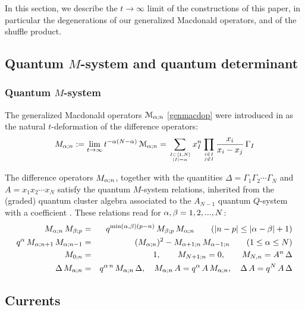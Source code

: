 
In this section, we describe the $t\to \infty$ limit of the constructions of this paper, in particular the 
degenerations of our generalized Macdonald operators, and of the shuffle product.

\subsection{Quantum $M$-system and quantum determinant}

\subsubsection{Quantum $M$-system}
The generalized Macdonald operators ${\mathcal M}_{{\alpha};n}$ \eqref{genmacdop} were introduced in \cite{DFK15} 
as the natural $t$-deformation of the difference operators:
\begin{equation}\label{oldmac}
M_{{\alpha};n}:=\lim_{t\to \infty} t^{-{\alpha}(N-{\alpha})}\, {\mathcal M}_{{\alpha};n}=\sum_{I\subset [1,N]\atop |I|={\alpha}} x_I^n \prod_{i\in I\atop j\not\in I}
\frac{x_i}{x_i-x_j} \, \Gamma_I
\end{equation}

The difference operators $M_{{\alpha};n}$, together with the quantities $\Delta=\Gamma_1\Gamma_2\cdots \Gamma_N$
and $A=x_1x_2\cdots x_N$ satisfy the quantum $M$-system relations, inherited from the (graded) quantum cluster algebra
associated to the $A_{N-1}$ quantum $Q$-system with a coefficient \cite{DFK15}.
These relations read for ${\alpha},\beta =1,2,...,N$:
\begin{eqnarray*}
M_{{\alpha};n}\, M_{\beta;p}&=& q^{\min({\alpha},\beta)(p-n)}\, M_{\beta;p}\, M_{{\alpha};n}\qquad (|n-p|\leq |{\alpha}-\beta|+1)\\
q^{\alpha} \, M_{{\alpha};n+1} \, M_{{\alpha};n-1}&=& (M_{{\alpha};n})^2-M_{{\alpha}+1;n}\, M_{{\alpha}-1;n} \qquad (1\leq {\alpha} \leq N)\\
M_{0;n}&=&1 , \qquad M_{N+1;n}=0, \qquad M_{N,n}=A^n\,\Delta \\
\Delta\, M_{{\alpha};n}&=& q^{{\alpha}\, n}\, M_{{\alpha};n}\, \Delta, \quad M_{{\alpha};n}\, A= q^{\alpha} \, A \, M_{{\alpha};n},\quad 
\Delta\, A= q^N\, A\, \Delta
\end{eqnarray*}

\subsection{Currents}

